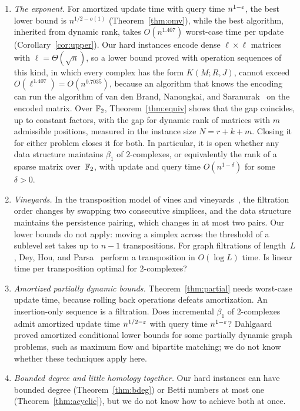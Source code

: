 \begin{enumerate}[leftmargin=*]
\item \emph{The exponent.}
For amortized update time with query time $n^{1-\varepsilon}$, the best lower bound is $n^{1/2-o(1)}$ (Theorem~\ref{thm:omv}), while the best algorithm, inherited from dynamic rank, takes $O(n^{1.407})$ worst-case time per update (Corollary~\ref{cor:upper}).
Our hard instances encode dense $\ell\times\ell$ matrices with $\ell=\Theta(\sqrt n)$, so a lower bound proved with operation sequences of this kind, in which every complex has the form $K(M;R,J)$, cannot exceed $O(\ell^{1.407})=O(n^{0.7035})$, because an algorithm that knows the encoding can run the algorithm of van den Brand, Nanongkai, and Saranurak~\cite{vdBNS19} on the encoded matrix.
Over $\mathbb{F}_2$, Theorem~\ref{thm:equiv} shows that the gap coincides, up to constant factors, with the gap for dynamic rank of matrices with $m$ admissible positions, measured in the instance size $N=r+k+m$.
Closing it for either problem closes it for both.
In particular, it is open whether any data structure maintains $\beta_1$ of $2$-complexes, or equivalently the rank of a sparse matrix over~$\mathbb{F}_2$, with update and query time $O(n^{1-\delta})$ for some $\delta>0$.
\item \emph{Vineyards.}
In the transposition model of vines and vineyards~\cite{CEMS06}, the filtration order changes by swapping two consecutive simplices, and the data structure maintains the persistence pairing, which changes in at most two pairs.
Our lower bounds do not apply: moving a simplex across the threshold of a sublevel set takes up to $n-1$ transpositions.
For graph filtrations of length~$L$, Dey, Hou, and Parsa~\cite{DHP23} perform a transposition in $O(\log L)$ time.
Is linear time per transposition optimal for $2$-complexes?
\item \emph{Amortized partially dynamic bounds.}
Theorem~\ref{thm:partial} needs worst-case update time, because rolling back operations defeats amortization.
An insertion-only sequence is a filtration.
Does incremental $\beta_1$ of $2$-complexes admit amortized update time $n^{1/2-\varepsilon}$ with query time $n^{1-\varepsilon}$?
Dahlgaard~\cite{Dah16} proved amortized conditional lower bounds for some partially dynamic graph problems, such as maximum flow and bipartite matching; we do not know whether these techniques apply here.
\item \emph{Bounded degree and little homology together.}
Our hard instances can have bounded degree (Theorem~\ref{thm:bdeg}) or Betti numbers at most one (Theorem~\ref{thm:acyclic}), but we do not know how to achieve both at once.

\end{enumerate}
